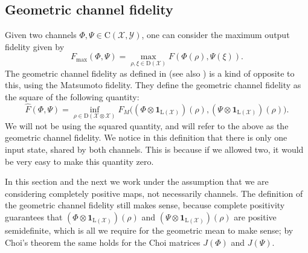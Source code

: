 \subsection{Geometric channel fidelity}
Given two channels $\Phi, \Psi\in \mathrm{C}(\mathcal{X},\mathcal{Y})$, one can consider the maximum output fidelity \cite[Section~3.3]{watrous2018theory} given by 
\[
    F_{\max}(\Phi,\Psi)=\max_{\rho,\xi\in \mathrm{D}(\mathcal{X})}F(\Phi(\rho),\Psi(\xi)).
\]
The geometric channel fidelity as defined in \cite{KatariyaWilde2021} (see also \cite[eq.~(19)]{NuradhaWilde2025}) is a kind of opposite to this, using the Matsumoto fidelity. They define the geometric channel fidelity as the square of the following quantity: 
\[
    \widehat{F}(\Phi,\Psi)=\inf_{\rho\in \mathrm{D}(\mathcal{X}\otimes\mathcal{X})}F_M\big((\Phi\otimes\mathbf{1}_{\mathrm{L}(\mathcal{X})})(\rho), (\Psi\otimes\mathbf{1}_{\mathrm{L}(\mathcal{X})})(\rho)\big).
\] 
We will not be using the squared quantity, and will refer to the above as the geometric channel fidelity. 
We notice in this definition that there is only one input state, shared by both channels. This is because if we allowed two, it would be very easy to make this quantity zero. 
 
In this section and the next we work under the assumption that we are considering completely positive maps, not necessarily channels. The definition of the geometric channel fidelity still makes sense, because complete positivity guarantees that $(\Phi\otimes\mathbf{1}_{\mathrm{L}(\mathcal{X})})(\rho)$ and $(\Psi\otimes\mathbf{1}_{\mathrm{L}(\mathcal{X})})(\rho)$ are positive semidefinite, which is all we require for the geometric mean to make sense; by Choi's theorem \cite{Choi1975} the same holds for the Choi matrices $J(\Phi)$ and $J(\Psi)$.  
 
